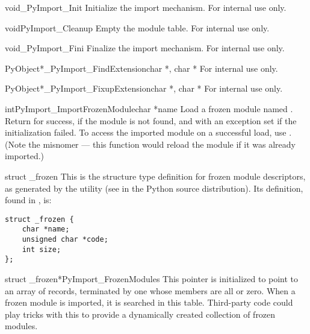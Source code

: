 \documentclass{manual}
\begin{document}
\begin{cfuncdesc}{void}{_PyImport_Init}{}
Initialize the import mechanism.  For internal use only.
\end{cfuncdesc}

\begin{cfuncdesc}{void}{PyImport_Cleanup}{}
Empty the module table.  For internal use only.
\end{cfuncdesc}

\begin{cfuncdesc}{void}{_PyImport_Fini}{}
Finalize the import mechanism.  For internal use only.
\end{cfuncdesc}

\begin{cfuncdesc}{PyObject*}{_PyImport_FindExtension}{char *, char *}
For internal use only.
\end{cfuncdesc}

\begin{cfuncdesc}{PyObject*}{_PyImport_FixupExtension}{char *, char *}
For internal use only.
\end{cfuncdesc}

\begin{cfuncdesc}{int}{PyImport_ImportFrozenModule}{char *name}
Load a frozen module named .  Return  for success,
 if the module is not found, and  with an exception
set if the initialization failed.  To access the imported module on a
successful load, use .
(Note the misnomer --- this function would reload the module if it was
already imported.)
\end{cfuncdesc}

\begin{ctypedesc}[_frozen]{struct _frozen}
This is the structure type definition for frozen module descriptors,
as generated by the  utility
(see  in the Python source distribution).  Its
definition, found in , is:

\begin{verbatim}
struct _frozen {
    char *name;
    unsigned char *code;
    int size;
};
\end{verbatim}
\end{ctypedesc}

\begin{cvardesc}{struct _frozen*}{PyImport_FrozenModules}
This pointer is initialized to point to an array of  records, terminated by one whose members are all
\NULL{} or zero.  When a frozen module is imported, it is searched in
this table.  Third-party code could play tricks with this to provide a 
dynamically created collection of frozen modules.
\end{cvardesc}
\end{document}
